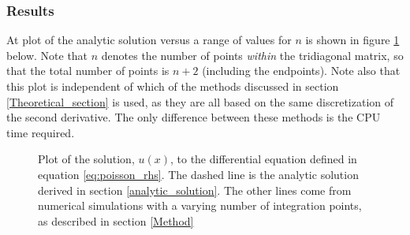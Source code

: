 \documentclass[a4paper, 10pt]{article}
\begin{document}
\subsubsection{Results}
At plot of the analytic solution versus a range of values for $n$ is shown in figure \ref{fig:figure_1} below. Note that $n$ denotes the number of points \textit{within} the tridiagonal matrix, so that the total number of points is $n+2$ (including the endpoints). Note also that this plot is independent of which of the methods discussed in section \ref{Theoretical_section} is used, as they are all based on the same discretization of the second derivative. The only difference between these methods is the CPU time required.\\
\begin{figure}[h]
\caption{Plot of the solution, $u(x)$,  to the differential equation defined in equation
\ref{eq:poisson_rhs}. The dashed line is the analytic solution derived in section \ref{analytic_solution}. The other lines come from numerical simulations with a varying number of integration points, as described in section \ref{Method}}
\label{fig:figure_1}
\end{figure}
\end{document}
